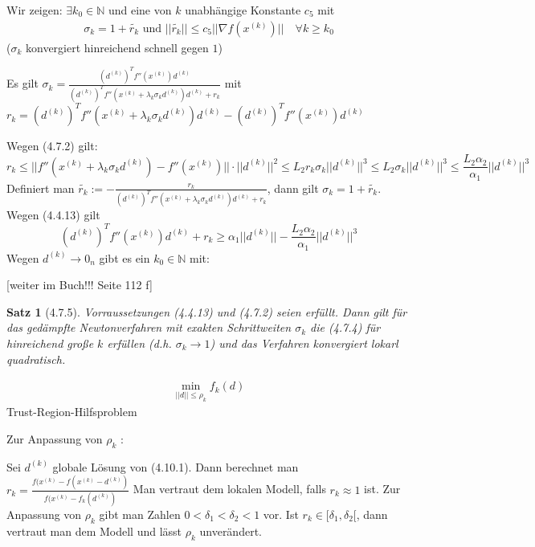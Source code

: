 \documentclass[ngerman,halfparskip]{scrartcl}
\newtheorem*{satz}{Satz}
\theoremstyle{definition}
\def\N{\mathbb N}
\begin{document}
Wir zeigen: $\exists k_0\in \N$ und eine von $k$ unabhängige Konstante $c_5$ mit 
\begin{gather*}\tag{4.7.4}
\sigma_k=1+\tilde{r_k} \text{ und } ||\tilde{r_k}||\leq c_5||\nabla f (x^{(k)})|| \quad \forall k\geq k_0
\end{gather*}
 ($\sigma_k$ konvergiert hinreichend schnell gegen $1$)
 
 Es gilt $\sigma_k=\frac{(d^{(k)})^Tf''(x^{(k)}) d^{(k)}}{(d^{(k)})^Tf''(x^{(k)}+\lambda_k \sigma_k d^{(k)}) d^{(k)}+r_k}$ mit $r_k=(d^{(k)})^Tf''(x^{(k)}+\lambda_k \sigma_k d^{(k)}) d^{(k)}-(d^{(k)})^Tf''(x^{(k)}) d^{(k)}$
 
 Wegen (4.7.2) gilt:
 $$r_k\leq ||f''(x^{(k)}+\lambda_k \sigma_k d^{(k)})-f''(x^{(k)}) ||\cdot ||d^{(k)}||^2 \leq L_2r_k\sigma_k||d^{(k)}||^3 \leq L_2\sigma_k||d^{(k)}||^3\leq \frac{L_2\alpha_2}{\alpha_1}||d^{(k)}||^3$$
 Definiert man $\tilde{r_k}:=-\frac{r_k}{(d^{(k)})^Tf''(x^{(k)}+\lambda_k \sigma_k d^{(k)}) d^{(k)}+r_k}$, dann gilt $\sigma_k=1+\tilde{r_k}$. Wegen (4.4.13) gilt
 $$(d^{(k)})^Tf''(x^{(k)}) d^{(k)}+r_k\geq \alpha_1 ||d^{(k)}||-\frac{L_2\alpha_2}{\alpha_1}||d^{(k)}||^3$$
 Wegen $d^{(k)}\rightarrow 0_n$ gibt es ein $k_0\in\N $ mit:
 
 [weiter im Buch!!! Seite 112 f]


\begin{satz}[4.7.5]
Vorraussetzungen (4.4.13) und (4.7.2) seien erfüllt. Dann gilt für das gedämpfte Newtonverfahren mit exakten Schrittweiten $\sigma_k$ die (4.7.4) für hinreichend große $k$ erfüllen (d.h. $\sigma_k\rightarrow 1$) und das Verfahren konvergiert lokarl quadratisch.
\end{satz}



























\begin{gather*}\tag{4.10.1}
\min\limits_{||d||\leq \rho_k}f_k(d)
\end{gather*}
Trust-Region-Hilfsproblem

Zur Anpassung von $\rho_k$ :

Sei $d^{(k)}$ globale Lösung von (4.10.1). Dann berechnet man\\
$r_k=\frac{f(x^{(k)}-f(x^{(k)}-d^{(k)})}{f(x^{(k)}-f_k(d^{(k)})}$ Man vertraut dem lokalen Modell, falls $r_k \approx 1$ ist. Zur Anpassung von $\rho_k$ gibt man Zahlen $0<\delta_1 < \delta_2 <1$ vor. Ist $r_k\in[\delta_1,\delta_2[$, dann vertraut man dem Modell und lässt $\rho_k$ unverändert.
\end{document}
